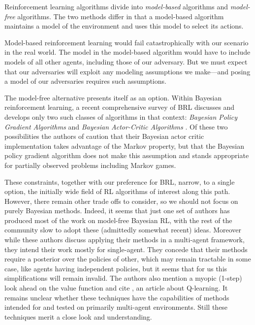 \documentclass{article}
\begin{document}
Reinforcement learning algorithms divide into \emph{model-based}
algorithms and \emph{model-free} algorithms.  The two methods differ
in that a model-based algorithm maintains a model of the environment
and uses this model to select its actions.

Model-based reinforcement learning would fail catastrophically with
our scenario in the real world.  The model in the model-based
algorithm would have to include models of all other agents, including
those of our adversary.  But we must expect that our adversaries will
exploit any modeling assumptions we make---and posing a model of our
adversaries requires such assumptions.

The model-free alternative presents itself as an option.  Within
Bayesian reinforcement learning, a recent comprehensive survey of BRL
\cite{ghavamzadeh2016bayesian} discusses and develops only two such
classes of algorithms in that context: \emph{Bayesian Policy Gradient
  Algorithms} \cite{engel2007bayesian, ghavamzadeh2016abayesian} and
\emph{Bayesian Actor-Critic Algorithms} \cite{ghavamzadeh2007bayesian,
  ghavamzadeh2016abayesian}.  Of these two possibilities the authors
of \cite{ghavamzadeh2016bayesian} caution that their Bayesian actor
critic implementation takes advantage of the Markov property, but that
the Bayesian policy gradient algorithm does not make this assumption
and stands appropriate for partially observed problems including
Markov games.

These constraints, together with our preference for BRL, narrow, to a
single option, the initially wide field of RL algorithms of interest
along this path.  However, there remain other trade offs to consider,
so we should not focus on purely Bayesian methods.  Indeed, it seems
that just one set of authors has produced most of the work on
model-free Bayesian RL, with the rest of the community slow to adopt
these (admittedly somewhat recent) ideas.  Moreover while these
authors discuss applying their methods in a multi-agent framework,
they intend their work mostly for single-agent.  They concede that
their methods require a posterior over the policies of other, which
may remain tractable in some case, like agents having independent
policies, but it seems that for us this simplifications will remain
invalid.  The authors also mention a myopic (1-step) look ahead on the
value function and cite \cite{dearden1998bayesian}, an article about
Q-learning.  It remains unclear whether these techniques have the
capabilities of methods intended for and tested on primarily
multi-agent environments.  Still these techniques merit a close look
and understanding.
\end{document}

